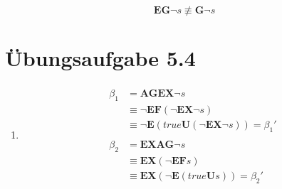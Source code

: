 \documentclass[a4paper]{scrartcl}
\begin{document}
\begin{enumerate}
\begin{enumerate}[(a)]
\begin{itemize}
                \end{itemize}
                \begin{equation*}
                    \textbf{EG}\lnot s \not\equiv \textbf{G}\lnot s
                \end{equation*}
                
        \end{enumerate}

\end{enumerate}

\section*{Übungsaufgabe 5.4}
\begin{enumerate}
    \item
        \begin{align}
            \begin{split}
                \beta_1 &= \textbf{AGEX} \lnot s \\
                &\equiv \lnot \textbf{EF} (\lnot \textbf{EX} \lnot s) \\
                &\equiv \lnot \textbf{E} (true \textbf{U} (\lnot \textbf{EX} \lnot s)) = \beta_1'
            \end{split} \\
            \begin{split}
                \beta_2 &= \textbf{EXAG} \lnot s \\
                &\equiv \textbf{EX} (\lnot \textbf{EF} s) \\
                &\equiv \textbf{EX} (\lnot \textbf{E} (true \textbf{U} s)) = \beta_2'
            \end{split}
        \end{align}
        


\end{enumerate}
\end{document}
